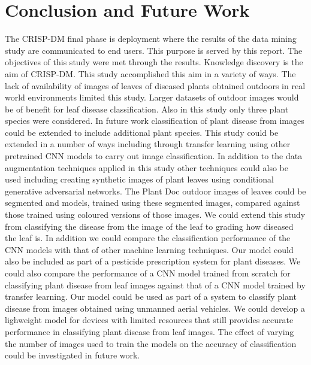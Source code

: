 \documentclass[conference]{IEEEtran}
\begin{document}
\section{Conclusion and Future Work}
The CRISP-DM final phase is deployment where the results of the data mining study are communicated to end users. This purpose is served by this report. The objectives of this study were met through the results. Knowledge discovery is the aim of CRISP-DM. This study accomplished this aim in a variety of ways. 
The lack of availability of images of leaves of diseased plants obtained outdoors in real world environments limited this study. Larger datasets of outdoor images would be of benefit for leaf disease classification. Also in this study only three plant species were considered. In future work classification of plant disease from images could be extended to include additional plant species. 
This study could be extended in a number of ways including through transfer learning using other pretrained CNN models to carry out image classification. In addition to the data augmentation techniques applied in this study other techniques could also be used including creating synthetic images of plant leaves using conditional generative adversarial networks. The Plant Doc outdoor images of leaves could be segmented and models, trained using these segmented images, compared against those trained using coloured versions of those images. We could extend this study from classifying the disease from the image of the leaf to grading how diseased the leaf is. In addition we could compare the classification performance of the CNN models with that of other machine learning techniques. Our model could also be included as part of a pesticide prescription system for plant diseases. We could also compare the performance of a CNN model trained from scratch for classifying plant disease from leaf images against that of a CNN model trained by transfer learning. Our model could be used as part of a system to classify plant disease from images obtained using unmanned aerial vehicles. We could develop a lighweight model for devices with limited resources that still provides accurate performance in classifying plant disease from leaf images. The effect of varying the number of images used to train the models on the accuracy of classification could be investigated in future work.      




\end{document}
